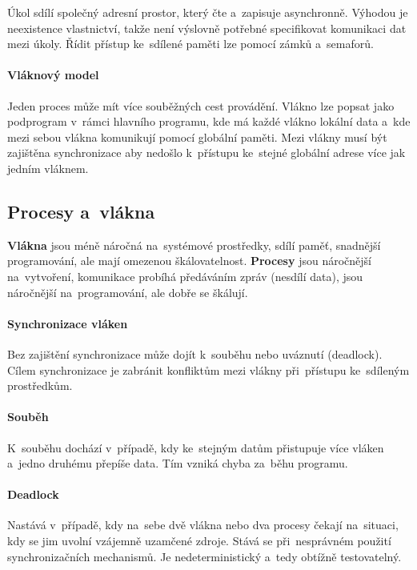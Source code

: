Úkol sdílí společný adresní prostor, který čte a~zapisuje asynchronně. Výhodou je neexistence vlastnictví, takže není výslovně potřebné specifikovat komunikaci dat mezi úkoly. Řídit přístup ke~sdílené paměti lze pomocí zámků a~semaforů.

\paragraph{Vláknový model}

Jeden proces může mít více souběžných cest provádění. Vlákno lze popsat jako podprogram v~rámci hlavního programu, kde má každé vlákno lokální data a~kde mezi sebou vlákna komunikují pomocí globální paměti. Mezi vlákny musí být zajištěna synchronizace aby nedošlo k~přístupu ke~stejné globální adrese více jak jedním vláknem.

\subsection{Procesy a~vlákna}

\textbf{Vlákna} jsou méně náročná na~systémové prostředky, sdílí paměť, snadnější programování, ale mají omezenou škálovatelnost. \textbf{Procesy} jsou náročnější na~vytvoření, komunikace probíhá předáváním zpráv (nesdílí data), jsou náročnější na~programování, ale dobře se škálují.

\paragraph{Synchronizace vláken}

Bez zajištění synchronizace může dojít k~souběhu nebo uváznutí (deadlock). Cílem synchronizace je zabránit konfliktům mezi vlákny při~přístupu ke~sdíleným prostředkům.

\paragraph{Souběh}

K~souběhu dochází v~případě, kdy ke~stejným datům přistupuje více vláken a~jedno druhému přepíše data. Tím vzniká chyba za~běhu programu.

\paragraph{Deadlock}

Nastává v~případě, kdy na~sebe dvě vlákna nebo dva procesy čekají na~situaci, kdy se jim uvolní vzájemně uzamčené zdroje. Stává se při~nesprávném použití synchronizačních mechanismů. Je nedeterministický a~tedy obtížně testovatelný.
